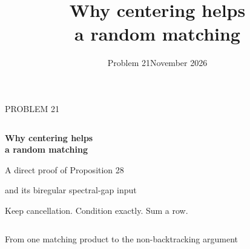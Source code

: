 \documentclass[aspectratio=169,11pt]{beamer}
\title{Why centering helps\protect\\a random matching}
\author{}
\date{Problem 21\quad November 2026}
\newcommand{\slidesource}{}
\newcommand{\source}[1]{\gdef\slidesource{#1}}
\newcommand{\1}{\mathbf 1}
\newcommand{\smallgap}{\vspace{2mm}}
\newcommand{\cellgrid}{\draw[grid,step=0.45] (0,0) grid (2.25,2.25);}
\begin{document}
\setlength{\abovedisplayskip}{7pt}
\setlength{\belowdisplayskip}{7pt}
\setlength{\abovedisplayshortskip}{4pt}
\setlength{\belowdisplayshortskip}{4pt}

\source{Problem 21 submission. The report contains the full proofs, source audit and tool-use record.}
\begin{frame}[plain]
\vspace{5mm}
{\color{teal}\normalsize PROBLEM 21}\par\vspace{5mm}
\begin{columns}[T,onlytextwidth]
\begin{column}{0.69\textwidth}
{\fontsize{26}{30}\selectfont\bfseries Why centering helps\\a random matching}\par
\vspace{5mm}
{\large A direct proof of Proposition 28}\par
\smallgap
{\large and its biregular spectral-gap input}\par
\vspace{7mm}
{\color{muted}\normalsize Keep cancellation. Condition exactly. Sum a row.}
\par\vspace{3mm}
{\color{muted}\normalsize\insertauthor}
\end{column}
\begin{column}{0.27\textwidth}
\centering
{}
\end{column}
\end{columns}
\vfill
{\color{navy}\large From one matching product to the non-backtracking argument}
\end{frame}
\end{document}
